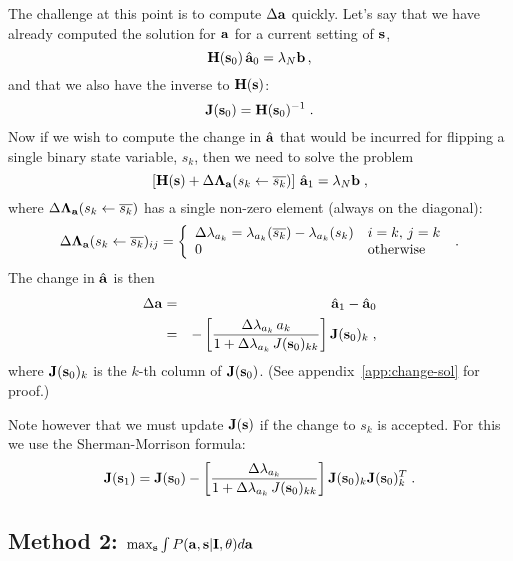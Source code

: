 \documentclass[12pt]{article}
\newcommand{\params}{\theta}
\newcommand{\ba}{{\bf a}}
\newcommand{\bah}{\hat{\bf a}}
\newcommand{\bs}{{\bf s}}
\newcommand{\bI}{{\bf I}}
\newcommand{\bLambdaa}{{\bf \Lambda_a}}
\newcommand{\bb}{{\bf b}}
\def\lnot{\overline}
\newcommand{\flipsk}{s_k\leftarrow\lnot{s_k}}
\newcommand{\bH}{{\bf H}}
\newcommand{\bJ}{{\bf J}}
\begin{document}
The challenge at this point is to compute $\Delta\ba$ quickly.  Let's say
that we have already computed the solution for $\ba$ for a current setting
of $\bs$,
\begin{equation}
\bH(\bs_0) \, \bah_0 = \lambda_N \bb \, ,
\end{equation}
and that we also have the inverse to $\bH(\bs)$:
\begin{equation}
\bJ(\bs_0)=\bH(\bs_0)^{-1} \; .
\end{equation}
Now if we wish to compute the change in $\bah$ that would be incurred for
flipping a single binary state variable, $s_k$, then we need to solve
the problem
\begin{equation}
\left[ \bH(\bs) + \Delta\bLambdaa(\flipsk) \right]\, \bah_1 = \lambda_N \bb \; ,
\end{equation}
where $\Delta\bLambdaa(\flipsk)$ has a single non-zero element (always on the
diagonal):
\begin{equation}
\Delta\bLambdaa(\flipsk)_{ij}=\left\{ \begin{array}{ll}
 \Delta\lambda_{a_k}=\lambda_{a_k}(\lnot{s_k})-\lambda_{a_k}(s_k) & i=k,\,j=k \\
 0 & \mbox{otherwise}
                                \end{array}  \right. \; .
\end{equation}
The change in $\bah$ is then
\begin{eqnarray}
\Delta \ba & = & \bah_1 - \bah_0 \\
 & = & -\left[\frac{\Delta\lambda_{a_k}\, a_k}
                   {1+\Delta\lambda_{a_k}\, J(\bs_0)_{kk}} \right] 
        \bJ(\bs_0)_k \; ,
\label{eq:change-sol}
\end{eqnarray}
where $\bJ(\bs_0)_k$ is the $k$-th column of $\bJ(\bs_0)$.  (See
appendix~\ref{app:change-sol} for proof.)

Note however that we must update $\bJ(\bs)$ if the change to $s_k$ is 
accepted.  For this we use the Sherman-Morrison formula:
\begin{equation}
\bJ(\bs_1) = \bJ(\bs_0) - \left[ \frac{\Delta\lambda_{a_k}}
                               {1+\Delta\lambda_{a_k}\, J(\bs_0)_{kk}} \right]
                    \bJ(\bs_0)_k \bJ(\bs_0)_k^T \; .
\end{equation}


\subsection{Method 2: $\max_{\bs} \int P(\ba,\bs|\bI,\params) d\ba$}
\end{document}
